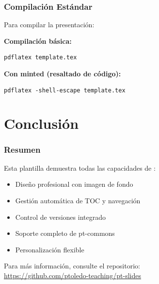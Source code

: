 \documentclass{pt-slides}
\begin{document}
\begin{frame}[fragile]
    \frametitle{Compilación Estándar}

    Para compilar la presentación:

    \vspace{0.3cm}

    \textbf{Compilación básica:}
    \begin{verbatim}
pdflatex template.tex
    \end{verbatim}

    \vspace{0.5cm}

    \textbf{Con minted (resaltado de código):}
    \begin{verbatim}
pdflatex -shell-escape template.tex
    \end{verbatim}
\end{frame}

\section{Conclusión}

\begin{frame}
    \frametitle{Resumen}

    Esta plantilla demuestra todas las capacidades de :

    \begin{itemize}
        \item Diseño profesional con imagen de fondo
        \item Gestión automática de TOC y navegación
        \item Control de versiones integrado
        \item Soporte completo de pt-commons
        \item Personalización flexible
    \end{itemize}

    \vspace{0.5cm}

    \begin{highlightbox}
        Para más información, consulte el repositorio: \\
        \url{https://github.com/ptoledo-teaching/pt-slides}
    \end{highlightbox}
\end{frame}

\end{document}
